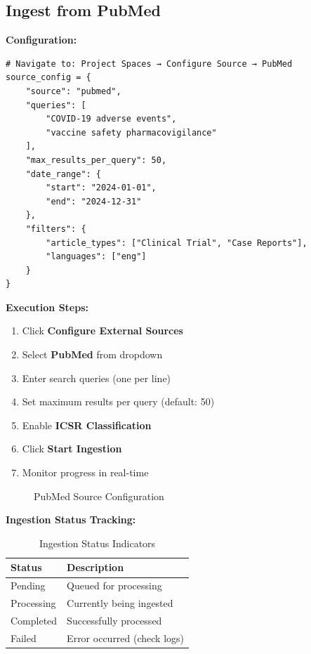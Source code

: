 \subsection{Ingest from PubMed}

\textbf{Configuration:}

\begin{lstlisting}[style=pythonstyle]
# Navigate to: Project Spaces → Configure Source → PubMed
source_config = {
    "source": "pubmed",
    "queries": [
        "COVID-19 adverse events",
        "vaccine safety pharmacovigilance"
    ],
    "max_results_per_query": 50,
    "date_range": {
        "start": "2024-01-01",
        "end": "2024-12-31"
    },
    "filters": {
        "article_types": ["Clinical Trial", "Case Reports"],
        "languages": ["eng"]
    }
}
\end{lstlisting}

\textbf{Execution Steps:}

\begin{enumerate}
    \item Click \textbf{Configure External Sources}
    \item Select \textbf{PubMed} from dropdown
    \item Enter search queries (one per line)
    \item Set maximum results per query (default: 50)
    \item Enable \textbf{ICSR Classification}
    \item Click \textbf{Start Ingestion}
    \item Monitor progress in real-time
\end{enumerate}

\begin{figure}[h]
\centering
{}
\caption{PubMed Source Configuration}
\label{fig:pubmed-config}
\end{figure}

\textbf{Ingestion Status Tracking:}

\begin{table}[h]
\centering
\caption{Ingestion Status Indicators}
\begin{tabularx}{\textwidth}{lX}
\toprule
\textbf{Status} & \textbf{Description} \\
\midrule
\textcolor{warningyellow}{Pending} & Queued for processing \\
\textcolor{primaryblue}{Processing} & Currently being ingested \\
\textcolor{successgreen}{Completed} & Successfully processed \\
\textcolor{errorred}{Failed} & Error occurred (check logs) \\
\bottomrule
\end{tabularx}
\end{table}

